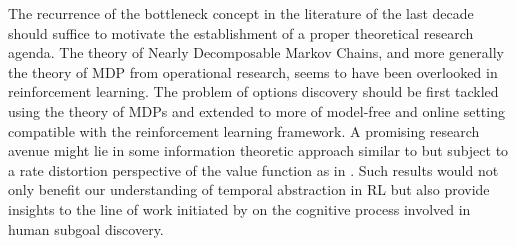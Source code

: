 The recurrence of the bottleneck concept in the literature of the last decade should suffice to motivate the establishment of a proper theoretical research agenda.  The theory of Nearly Decomposable Markov Chains, and more generally the theory of MDP from operational research, seems to have been overlooked in reinforcement learning. The problem of options discovery should be first tackled using the theory of MDPs and extended to more of model-free and online setting compatible with the reinforcement learning framework. A promising research avenue might lie in some information theoretic approach similar to \cite{Deng2011} but subject to a rate distortion perspective of the value function as in \cite{Still2012}. Such results would not only benefit our understanding of temporal abstraction in RL but also provide insights to the line of work initiated by \cite{Botvinick2012} on the cognitive process involved in human subgoal discovery.
